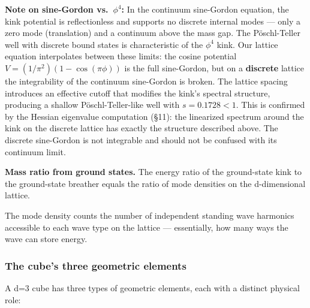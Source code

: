 \documentclass[
]{article}
\begin{document}
\textbf{Note on sine-Gordon vs.~\(\phi^4\):} In the continuum
sine-Gordon equation, the kink potential is reflectionless and supports
no discrete internal modes --- only a zero mode (translation) and a
continuum above the mass gap. The Pöschl-Teller well with discrete bound
states is characteristic of the \(\phi^4\) kink. Our lattice equation
interpolates between these limits: the cosine potential
\(V = (1/\pi^2)(1-\cos(\pi\phi))\) is the full sine-Gordon, but on a
\textbf{discrete} lattice the integrability of the continuum sine-Gordon
is broken. The lattice spacing introduces an effective cutoff that
modifies the kink's spectral structure, producing a shallow
Pöschl-Teller-like well with \(s = 0.1728 < 1\). This is confirmed by
the Hessian eigenvalue computation (§11): the linearized spectrum around
the kink on the discrete lattice has exactly the structure described
above. The discrete sine-Gordon is not integrable and should not be
confused with its continuum limit.

\textbf{Mass ratio from ground states.} The energy ratio of the
ground-state kink to the ground-state breather equals the ratio of mode
densities on the d-dimensional lattice.

The mode density counts the number of independent standing wave
harmonics accessible to each wave type on the lattice --- essentially,
how many ways the wave can store energy.

\subsubsection{The cube's three geometric
elements}\label{the-cubes-three-geometric-elements}

A d=3 cube has three types of geometric elements, each with a distinct
physical role:
\end{document}
